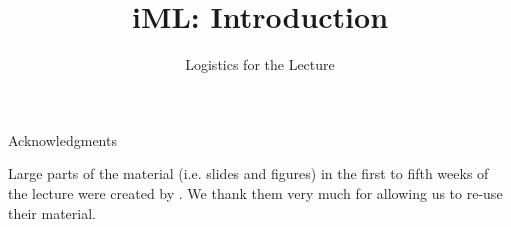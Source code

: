 \documentclass[aspectratio=169]{../latex_main/tntbeamer}  %
\title[Introduction]{iML: Introduction}
\subtitle{Logistics for the Lecture}
\begin{document}
	
	\maketitle

\begin{frame}[c]{Acknowledgments}

Large parts of the material (i.e. slides and figures) in the first to fifth weeks of the lecture were created by . We thank them very much for allowing us to re-use their material.


\end{frame}
\end{document}
